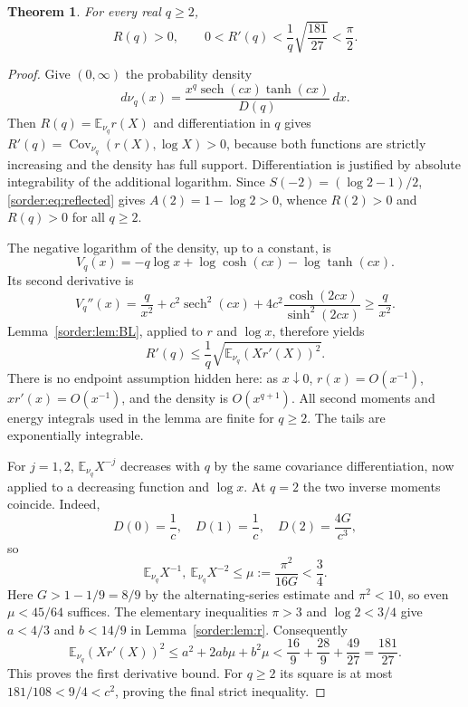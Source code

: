\documentclass[11pt,a4paper]{article}
\newtheorem{theorem}{Theorem}[section]
\theoremstyle{definition}
\theoremstyle{remark}
\newcommand{\sech}{\operatorname{sech}}
\newcommand{\E}{\mathbb E}
\newcommand{\Cov}{\operatorname{Cov}}
\numberwithin{equation}{section}
\begin{document}
\begin{theorem}\label{sorder:thm:R}
For every real $q\ge2$,
\begin{equation}\label{sorder:eq:R-bound}
 R(q)>0,\qquad
 0<R'(q)<\frac1q\sqrt{\frac{181}{27}}<\frac\pi2.
\end{equation}
\end{theorem}
\begin{proof}
Give $(0,\infty)$ the probability density
\[
 d\nu_q(x)=\frac{x^q\sech(cx)\tanh(cx)}{D(q)}\,dx.
\]
Then $R(q)=\E_{\nu_q}r(X)$ and differentiation in $q$ gives
$R'(q)=\Cov_{\nu_q}(r(X),\log X)>0$, because both functions are
strictly increasing and the density has full support. Differentiation
is justified by absolute integrability of the additional logarithm.
Since $S(-2)=(\log2-1)/2$, \eqref{sorder:eq:reflected} gives
$A(2)=1-\log2>0$, whence $R(2)>0$ and $R(q)>0$ for all $q\ge2$.

The negative logarithm of the density, up to a constant, is
\[
 V_q(x)=-q\log x+\log\cosh(cx)-\log\tanh(cx).
\]
Its second derivative is
\[
 V_q''(x)=\frac q{x^2}+c^2\sech^2(cx)
     +4c^2\frac{\cosh(2cx)}{\sinh^2(2cx)}\ge\frac q{x^2}.
\]
Lemma~\ref{sorder:lem:BL}, applied to $r$ and $\log x$, therefore yields
\begin{equation}\label{sorder:eq:covariance-bound}
 R'(q)\le\frac1q\sqrt{\E_{\nu_q}(Xr'(X))^2}.
\end{equation}
There is no endpoint assumption hidden here: as $x\downarrow0$,
$r(x)=O(x^{-1})$, $xr'(x)=O(x^{-1})$, and the density is
$O(x^{q+1})$. All second moments and energy integrals used in the
lemma are finite for $q\ge2$. The tails are exponentially integrable.

For $j=1,2$, $\E_{\nu_q}X^{-j}$ decreases with $q$ by the same
covariance differentiation, now applied to a decreasing function and
$\log x$. At $q=2$ the two inverse moments coincide. Indeed,
\[
 D(0)=\frac1c,\quad D(1)=\frac1c,\quad D(2)=\frac{4G}{c^3},
\]
so
\[
 \E_{\nu_q}X^{-1},\ \E_{\nu_q}X^{-2}
 \le\mu:=\frac{\pi^2}{16G}<\frac34.
\]
Here $G>1-1/9=8/9$ by the alternating-series estimate and
$\pi^2<10$, so even $\mu<45/64$ suffices. The elementary inequalities
$\pi>3$ and $\log2<3/4$ give $a<4/3$ and $b<14/9$ in
Lemma~\ref{sorder:lem:r}. Consequently
\[
 \E_{\nu_q}(Xr'(X))^2
 \le a^2+2ab\mu+b^2\mu
 <\frac{16}{9}+\frac{28}{9}+\frac{49}{27}
 =\frac{181}{27}.
\]
This proves the first derivative bound. For $q\ge2$ its square is
at most $181/108<9/4<c^2$, proving the final strict inequality.
\end{proof}
\end{document}
